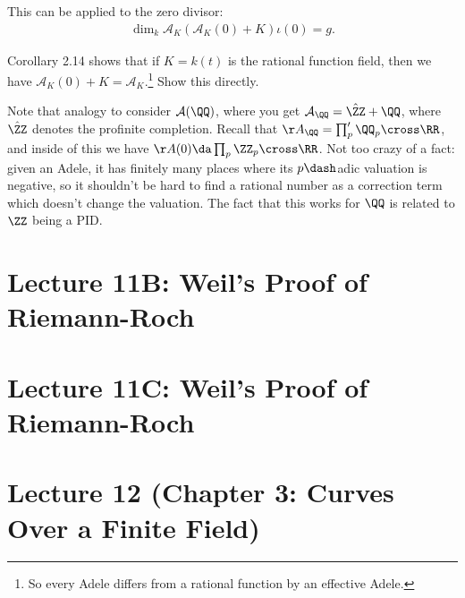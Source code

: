 \begin{corollary}[2.14]

This can be applied to the zero divisor:
\begin{align*}  
\dim_k \mathcal{A}_K( \mathcal{A}_K(0) + K ) \iota(0) = g
.\end{align*}

\end{corollary}

\begin{exercise}[?]

Corollary 2.14 shows that if \(K = k(t)\) is the rational function
field, then we have \(\mathcal{A}_K(0) + K = \mathcal{A}_K\).\footnote{So
  every Adele differs from a rational function by an effective Adele.}
Show this directly.

\end{exercise}

\begin{remark}

Note that analogy to consider \(\mathcal{A}(\QQ)\), where you get
\(\mathcal{A}_\QQ = \hat \ZZ + \QQ\), where \(\hat \ZZ\) denotes the
profinite completion. Recall that
\(\AA_\QQ = \prod_p' \QQ_p \cross \RR\), and inside of this we have
\(\AA(0) \da \prod_p \ZZ_p \cross \RR\). Not too crazy of a fact: given
an Adele, it has finitely many places where its \(p\dash\)adic valuation
is negative, so it shouldn't be hard to find a rational number as a
correction term which doesn't change the valuation. The fact that this
works for \(\QQ\) is related to \(\ZZ\) being a PID.

\end{remark}

\hypertarget{lecture-11b-weils-proof-of-riemann-roch}{%
\section{Lecture 11B: Weil's Proof of
Riemann-Roch}\label{lecture-11b-weils-proof-of-riemann-roch}}

\hypertarget{lecture-11c-weils-proof-of-riemann-roch}{%
\section{Lecture 11C: Weil's Proof of
Riemann-Roch}\label{lecture-11c-weils-proof-of-riemann-roch}}

\hypertarget{lecture-12-chapter-3-curves-over-a-finite-field}{%
\section{Lecture 12 (Chapter 3: Curves Over a Finite
Field)}\label{lecture-12-chapter-3-curves-over-a-finite-field}}

